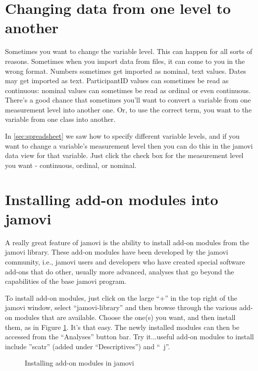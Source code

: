 \section{Changing data from one level to another\label{sec:coercion}}

Sometimes you want to change the variable level. This can happen for all sorts of reasons. Sometimes when you import data from files, it can come to you in the wrong format. Numbers sometimes get imported as nominal, text values. Dates may get imported as text. ParticipantID values can sometimes be read as continuous: nominal values can sometimes be read as ordinal or even continuous. There's a good chance that sometimes you'll want to convert a variable from one measurement level into another one. Or, to use the correct term, you want to  the variable from one class into another. 

In \ref{sec:spreadsheet} we saw how to specify different variable levels, and if you want to change a variable's measurement level then you can do this in the jamovi data view for that variable. Just click the check box for the measurement level you want - continuous, ordinal, or nominal. 


\section{Installing add-on modules into jamovi \label{sec:jamovimodules}}

A really great feature of jamovi is the ability to install add-on modules from the jamovi library. These add-on modules have been developed by the jamovi community, i.e., jamovi users and developers who have created special software add-ons that do other, usually more advanced, analyses that go beyond the capabilities of the base jamovi program. 

To install add-on modules, just click on the large \large{``+''} in the top right of the jamovi window, select ``jamovi-library'' and then browse through the various add-on modules that are available. Choose the one(s) you want, and then install them, as in Figure \ref{fig:modules}. It's that easy. The newly installed modules can then be accessed from the ``Analyses'' button bar. Try it...useful add-on modules to install include ''scatr'' (added under ``Descriptives'') and ``\R\ j''. 

\begin{figure}[htb]
\begin{center}
\caption{Installing add-on modules in jamovi}
\label{fig:modules}
\HR
\end{center}
\end{figure}


